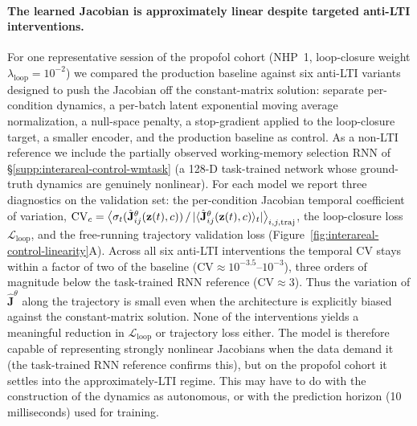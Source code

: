 \paragraph{The learned Jacobian is approximately linear despite targeted anti-LTI interventions.}
For one representative session of the propofol cohort (NHP~1, loop-closure weight $\lambda_{\mathrm{loop}}=10^{-2}$) we compared the production baseline against six anti-LTI variants designed to push the Jacobian off the constant-matrix solution: separate per-condition dynamics, a per-batch latent exponential moving average normalization, a null-space penalty, a stop-gradient applied to the loop-closure target, a smaller encoder, and the production baseline as control. As a non-LTI reference we include the partially observed working-memory selection RNN of \S\ref{supp:interareal-control-wmtask} (a 128-D task-trained network whose ground-truth dynamics are genuinely nonlinear). For each model we report three diagnostics on the validation set: the per-condition Jacobian temporal coefficient of variation, $\mathrm{CV}_{c}=\bigl\langle\sigma_{t}(\hat{\mathbf{J}}^{\theta}_{ij}(\vb{z}(t),c))\,/\,|\langle\hat{\mathbf{J}}^{\theta}_{ij}(\vb{z}(t),c)\rangle_{t}|\bigr\rangle_{i,j,\mathrm{traj}}$, the loop-closure loss $\mathcal{L}_{\mathrm{loop}}$, and the free-running trajectory validation loss (Figure~\ref{fig:interareal-control-linearity}A). Across all six anti-LTI interventions the temporal CV stays within a factor of two of the baseline ($\mathrm{CV}\!\approx\!10^{-3.5}$--$10^{-3}$), three orders of magnitude below the task-trained RNN reference ($\mathrm{CV}\!\approx\!3$). Thus the variation of $\hat{\mathbf{J}}^{\theta}$ along the trajectory is small even when the architecture is explicitly biased against the constant-matrix solution. None of the interventions yields a meaningful reduction in $\mathcal{L}_{\mathrm{loop}}$ or trajectory loss either. The model is therefore capable of representing strongly nonlinear Jacobians when the data demand it (the task-trained RNN reference confirms this), but on the propofol cohort it settles into the approximately-LTI regime. This may have to do with the construction of the dynamics as autonomous, or with the prediction horizon (10 milliseconds) used for training.

